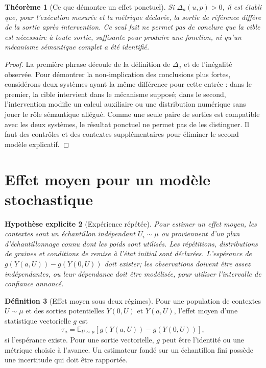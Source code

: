 \documentclass[11pt,oneside]{book}
\newtheorem{theoreme}{Théorème}[chapter]
\newtheorem{hypothese}[theoreme]{Hypothèse explicite}
\theoremstyle{definition}
\newtheorem{definition}[theoreme]{Définition}
\theoremstyle{remark}
\newcommand{\Exp}{\mathbb E}
\newcommand{\1}{\mathbf 1}
\begin{document}
\begin{theoreme}[Ce que démontre un effet ponctuel]
Si $\Delta_a(u,p)>0$, il est établi que, pour l'exécution mesurée et la métrique déclarée, la sortie de référence diffère de la sortie après intervention. Ce seul fait ne permet pas de conclure que la cible est nécessaire à toute sortie, suffisante pour produire une fonction, ni qu'un mécanisme sémantique complet a été identifié.
\end{theoreme}
\begin{proof}
La première phrase découle de la définition de $\Delta_a$ et de l'inégalité observée. Pour démontrer la non-implication des conclusions plus fortes, considérons deux systèmes ayant la même différence pour cette entrée : dans le premier, la cible intervient dans le mécanisme supposé; dans le second, l'intervention modifie un calcul auxiliaire ou une distribution numérique sans jouer le rôle sémantique allégué. Comme une seule paire de sorties est compatible avec les deux systèmes, le résultat ponctuel ne permet pas de les distinguer. Il faut des contrôles et des contextes supplémentaires pour éliminer le second modèle explicatif.
\end{proof}

\section{Effet moyen pour un modèle stochastique}
\begin{hypothese}[Expérience répétée]
Pour estimer un effet moyen, les contextes sont un échantillon indépendant $U_i\sim\mu$ ou proviennent d'un plan d'échantillonnage connu dont les poids sont utilisés. Les répétitions, distributions de graines et conditions de remise à l'état initial sont déclarées. L'espérance de $g(Y(a,U))-g(Y(0,U))$ doit exister; les observations doivent être assez indépendantes, ou leur dépendance doit être modélisée, pour utiliser l'intervalle de confiance annoncé.
\end{hypothese}

\begin{definition}[Effet moyen sous deux régimes]
Pour une population de contextes $U\sim\mu$ et des sorties potentielles $Y(0,U)$ et $Y(a,U)$, l'effet moyen d'une statistique vectorielle $g$ est
\[
\tau_a=\Exp_{U\sim\mu}[g(Y(a,U))-g(Y(0,U))],
\]
si l'espérance existe. Pour une sortie vectorielle, $g$ peut être l'identité ou une métrique choisie à l'avance. Un estimateur fondé sur un échantillon fini possède une incertitude qui doit être rapportée.
\end{definition}
\end{document}
